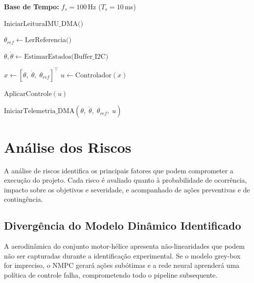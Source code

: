 \begin{algorithm}
\caption{Rotina de Controle em Tempo Real (Arquitetura DMA)}
\label{alg:isr_controle}
\begin{algorithmic}[1]
\Statex \textbf{Base de Tempo:} $f_s = 100$\,Hz ($T_s = 10$\,ms)
\Statex

    \State {}
    \State $\text{IniciarLeituraIMU\_DMA()}$ 
\EndProcedure

\Statex
{}
    \State {}
    \State $\theta_{ref} \gets \text{LerReferencia()}$

    \Statex
    \State {}
    \State $\theta, \dot{\theta} \gets \text{EstimarEstados(Buffer\_I2C)}$

    \Statex
    \State {}
    \State $x \gets [\theta,\; \dot{\theta},\; \theta_{ref}]^\top$
    \State $u \gets \text{Controlador}(x)$

    \Statex
    \State {}
    \State $\text{AplicarControle}(u)$

    \Statex
    \State {}
    \State $\text{IniciarTelemetria\_DMA}(\theta,\; \dot{\theta},\; \theta_{ref},\; u)$
\EndProcedure
\end{algorithmic}
\end{algorithm}
\chapter{Análise dos Riscos}

A análise de riscos identifica os principais fatores que podem comprometer a execução do projeto. Cada risco é avaliado quanto à probabilidade de ocorrência, impacto sobre os objetivos e severidade, e acompanhado de ações preventivas e de contingência.

\section{Divergência do Modelo Dinâmico Identificado}

A aerodinâmica do conjunto motor-hélice apresenta não-linearidades que podem não ser capturadas durante a identificação experimental. Se o modelo grey-box for impreciso, o NMPC gerará ações subótimas e a rede neural aprenderá uma política de controle falha, comprometendo todo o pipeline subsequente.

